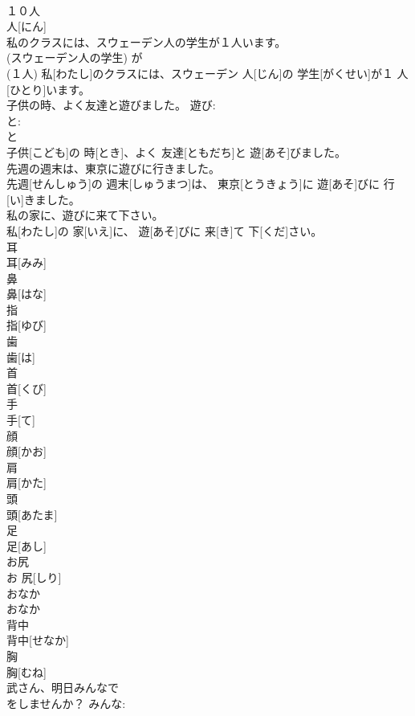 \documentclass[8pt]{extreport}
\begin{document}
\begin{CJK}{UTF8}{min}
\\	１０人	
\\	人[にん]		
\\	私のクラスには、スウェーデン人の学生が１人います。	
\\	(スウェーデン人の学生) が 
\\	(１人)	私[わたし]のクラスには、スウェーデン 人[じん]の 学生[がくせい]が１ 人[ひとり]います。	
\\	子供の時、よく友達と遊びました。	遊び: 
\\	と: 
\\	と 
\\	子供[こども]の 時[とき]、よく 友達[ともだち]と 遊[あそ]びました。	
\\	先週の週末は、東京に遊びに行きました。	
\\	先週[せんしゅう]の 週末[しゅうまつ]は、 東京[とうきょう]に 遊[あそ]びに 行[い]きました。	
\\	私の家に、遊びに来て下さい。	
\\	私[わたし]の 家[いえ]に、 遊[あそ]びに 来[き]て 下[くだ]さい。	
\\	耳	
\\	耳[みみ]		
\\	鼻	
\\	鼻[はな]		
\\	指	
\\	指[ゆび]		
\\	歯	
\\	歯[は]		
\\	首	
\\	首[くび]		
\\	手	
\\	手[て]		
\\	顔	
\\	顔[かお]		
\\	肩	
\\	肩[かた]		
\\	頭	
\\	頭[あたま]		
\\	足	
\\	足[あし]		
\\	お尻	
\\	お 尻[しり]		
\\	おなか	
\\	おなか		
\\	背中	
\\	背中[せなか]		
\\	胸	
\\	胸[むね]		
\\	武さん、明日みんなで
\\	をしませんか？	みんな: 

\end{CJK}
\end{document}
